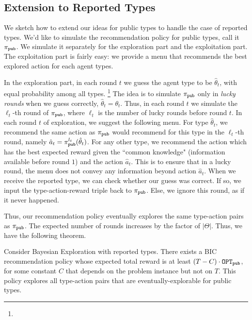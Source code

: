 
\subsection{Extension to Reported Types}
\label{sec:reported}

\newcommand{\pipub}{\pi_{\term{pub}}}

We sketch how to extend our ideas for public types to handle the case of reported types. We'd like to simulate the recommendation policy for public types, call it $\pipub$. We simulate it separately for the exploration part and the exploitation part. The exploitation part is fairly easy: we provide a menu that recommends the best explored action for each agent types. 

In the exploration part, in each round $t$ we guess the agent type to be $\hat{\theta}_t$, with equal probability among all types.%
\footnote{}
The idea is to simulate $\pipub$ only in \emph{lucky rounds} when we guess correctly, \ie $\hat{\theta}_t=\theta_t$. Thus,
in each round $t$ we simulate the $\ell_t$-th round of $\pipub$, where $\ell_t$ is the number of lucky rounds before round $t$. In each round $t$ of exploration, we suggest the following menu. For type $\hat{\theta}_t$, we recommend the same action as $\pipub$ would recommend for this type in the $\ell_t$-th round, namely
    $\hat{a}_t = \pipub^{\ell_t}(\hat{\theta}_t)$.
For any other type, we recommend the action which has the best expected reward given the ``common knowledge" (information available before round $1$) and the action $\hat{a}_t$. This is to ensure that in a lucky round, the menu does not convey any information beyond action  $\hat{a}_t$. When we receive the reported type, we can check whether our guess was correct. If so, we input the type-action-reward triple back to $\pipub$. Else, we ignore this round, as if it never happened.

Thus, our recommendation policy eventually explores the same type-action pairs as $\pipub$. The expected number of rounds increases by the factor of $|\varTheta|$. Thus, we have the following theorem.

\begin{theorem}
\label{thm:reported}
Consider Bayesian Exploration with reported types.
There exists a BIC recommendation policy whose expected total reward is at least $\left(T - C \right) \cdot \mathtt{OPT}_{\mathtt{pub}}$,
for some constant $C$ that depends on the problem instance but not on $T$.
This policy explores all type-action pairs that are eventually-explorable
for public types.
\end{theorem}

